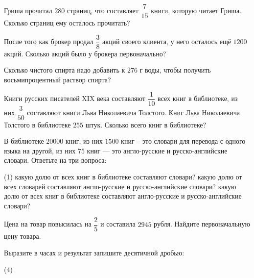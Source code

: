 %
%
\begin{class}[number=5]
	\begin{listofex}
		\item Гриша прочитал \(280\) страниц, что составляет \(\dfrac{7}{15}\) книги, которую читает Гриша. Сколько страниц ему осталось прочитать?
		\item После того как брокер продал \( \dfrac{3}{8} \) акций своего клиента, у него осталось ещё \(1200\) акций. Сколько акций было у брокера первоначально?
		\item Сколько чистого спирта надо добавить к \(276\) г воды, чтобы получить восьмипроцентный раствор спирта?
		\item Книги русских писателей XIX века составляют \(\dfrac{1}{10}\) всех книг в библиотеке, из них \(\dfrac{3}{50}\) составляют книги Льва Николаевича Толстого. Книг Льва Николаевича Толстого в библиотеке \(255\) штук. Сколько всего книг в библиотеке?
		\item В библиотеке \(20000\) книг, из них \(1500\) книг – это словари для перевода с одного языка на другой, из них \(75\) книг --- это англо-русские и русско-английские словари. Ответьте на три вопроса:
		\begin{tasks}(1)
			\task какую долю от всех книг в библиотеке составляют словари?
			\task какую долю от всех словарей составляют англо-русские и русско-английские словари?
			\task какую долю от всех книг в библиотеке составляют англо-русские и русско-английские словари?
		\end{tasks}
		\item Цена на товар повысилась на \(\dfrac{2}{5}\) и составила \(2945\) рубля. Найдите первоначальную цену товара.
		\item Выразите в часах и результат запишите десятичной дробью:
		\begin{tasks}(4)

\end{tasks}
\end{listofex}
\end{class}
